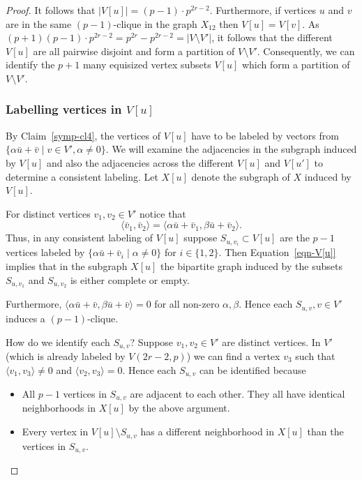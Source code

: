\documentclass[10pt,a4paper]{amsart}
\newcommand{\sympl}[1]{\langle #1 \rangle}
\begin{document}
\begin{proof}
It follows that $|V[u]|=(p-1)\cdot p^{2r-2}$. Furthermore, if vertices
$u$ and $v$ are in the same $(p-1)$-clique in the graph $X_{12}$ then
$V[u]=V[v]$. As
$(p+1)(p-1)\cdot p^{2r-2}=p^{2r}-p^{2r-2}=|V\setminus V'|$, it follows
that the different $V[u]$ are all pairwise disjoint and form a
partition of $V\setminus V'$. Consequently, we can identify the $p+1$
many equisized vertex subsets $V[u]$ which form a partition of
$V\setminus V'$.

\subsubsection*{Labelling vertices in $V[u]$}

By Claim~\ref{symp-cl4}, the vertices of $V[u]$ have to be labeled by
vectors from $\{\alpha\bar{u}+\bar{v}\mid v\in V', \alpha\ne 0\}$.  We
will examine the adjacencies in the subgraph induced by $V[u]$ and
also the adjacencies across the different $V[u]$ and $V[u']$ to
determine a consistent labeling. Let $X[u]$ denote the subgraph of $X$
induced by $V[u]$.

For distinct vertices $v_1, v_2\in V'$ notice that
\begin{equation}\label{eqn-V[u]}
  \sympl{\bar{v}_1,\bar{v}_2} =\sympl{\alpha \bar{u}+\bar{v}_1,\beta
    \bar{u}+\bar{v}_2}.
\end{equation}
Thus, in any consistent labeling of $V[u]$ suppose
$S_{u,v_i}\subset V[u]$ are the $p-1$ vertices labeled by
$\{\alpha\bar{u}+\bar{v}_i\mid \alpha \ne 0\}$ for $i\in\{1,2\}$. Then
Equation~\ref{eqn-V[u]} implies that in the subgraph $X[u]$ the
bipartite graph induced by the subsets $S_{u,v_1}$ and $S_{u,v_2}$
is either complete or empty.

Furthermore, $\sympl{\alpha\bar{u}+\bar{v},\beta\bar{u}+\bar{v}}=0$
for all non-zero $\alpha,\beta$. Hence each $S_{u,v}, v\in V'$ induces
a $(p-1)$-clique.

How do we identify each $S_{u,v}$? Suppose $v_1,v_2\in V'$ are
distinct vertices. In $V'$ (which is already labeled by $V(2r-2,p)$)
we can find a vertex $v_3$ such that $\sympl{v_1,v_3}\ne 0$ and
$\sympl{v_2,v_3}=0$. Hence each $S_{u,v}$ can be identified because
\begin{itemize}
\item All $p-1$ vertices in $S_{u,v}$ are adjacent to each other. They
  all have identical neighborhoods in $X[u]$ by the above argument.
\item Every vertex in $V[u]\setminus S_{u,v}$ has a different
  neighborhood in $X[u]$ than the vertices in $S_{u,v}$.
\end{itemize}


\end{proof}
\end{document}
